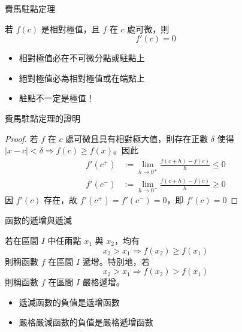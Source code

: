 \documentclass{beamer}
\begin{document}
\begin{CJK}{UTF8}{bsmi}
\begin{frame}{費馬駐點定理}
  \begin{theorem}
    若 $f(c)$ 是相對極值，且 $f$ 在 $c$ 處可微，則
    \[f'(c) = 0\]
  \end{theorem}
  \begin{itemize}
    \item 相對極值必在不可微分點或駐點上
    \item 絕對極值必為相對極值或在端點上
    \item 駐點不一定是極值！
  \end{itemize}
\end{frame}

\begin{frame}{費馬駐點定理的證明}
  \begin{proof}
    若 $f$ 在 $c$ 處可微且具有相對極大值，則存在正數 $\delta$ 使得 $|x-c| < \delta \Rightarrow f(c) \ge f(x)$。因此
    \begin{align*}
      f'(c^+) &:= \lim_{h\to0^+} \frac{f(c+h) - f(c)}{h} \le 0\\
      f'(c^-) &:= \lim_{h\to0^-} \frac{f(c+h) - f(c)}{h} \ge 0
    \end{align*}
    因 $f'(c)$ 存在，故 $f'(c^+) = f'(c^-) = 0$，即 $f'(c) = 0$
  \end{proof}
\end{frame}

\begin{frame}{函數的遞增與遞減}
  \begin{definition}
    若在區間 $I$ 中任兩點 $x_1$ 與 $x_2$，均有
    \[x_2 > x_1 \Rightarrow f(x_2) \ge f(x_1)\]
    則稱函數 $f$ 在區間 $I$ 遞增。特別地，若
    \[x_2 > x_1 \Rightarrow f(x_2) > f(x_1)\]
    則稱函數 $f$ 在區間 $I$ 嚴格遞增。
  \end{definition}
  \begin{definition}
    \begin{itemize}
      \item 遞減函數的負值是遞增函數
      \item 嚴格嚴減函數的負值是嚴格遞增函數
    \end{itemize}
  \end{definition}
\end{frame}


\end{CJK}
\end{document}
